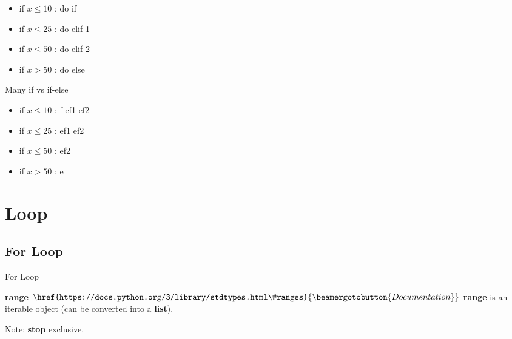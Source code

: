\documentclass{beamer}
\begin{document}
\begin{frame}
    \begin{example}
        
        \begin{itemize}
            \item if $x \le 10$ : do if
            \item if $x \le 25$ : do elif 1
            \item if $x \le 50$ : do elif 2
            \item if $x > 50$ : do else
        \end{itemize}
    \end{example}
\end{frame}

\begin{frame}
    \begin{alertblock}{Many if vs if-else}
        
        \begin{itemize}
            \item if $x \le 10$ : f ef1 ef2
            \item if $x \le 25$ : ef1 ef2
            \item if $x \le 50$ : ef2
            \item if $x > 50$ : e
        \end{itemize}
    \end{alertblock}

\end{frame}

\section{Loop}
\subsection{For Loop}
\begin{frame}{For Loop}
    \begin{block}{\textbf{range} $\href{https://docs.python.org/3/library/stdtypes.html\#ranges}{\beamergotobutton{Documentation}}$}
        \textbf{range} is an iterable object (can be converted into a \textbf{list}).
    \end{block}
    \begin{example}
        
        Note: \textbf{stop} exclusive.
    \end{example}
\end{frame}
\end{document}

